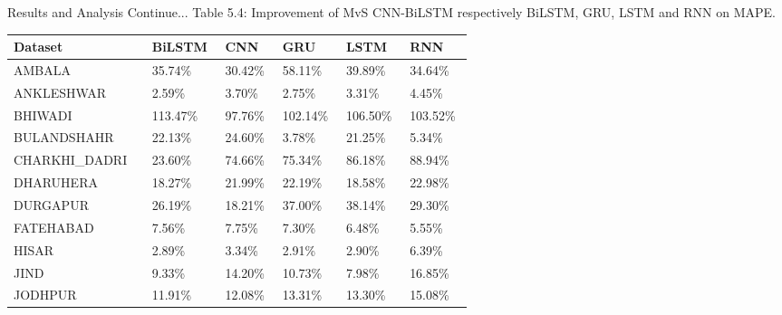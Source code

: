 \documentclass[12pt, aspectratio=169]{beamer}
\begin{document}
\begin{frame}{Results and Analysis \tiny{Continue...}}
	\centering
	\scriptsize{Table 5.4: Improvement of MvS CNN-BiLSTM respectively BiLSTM,  GRU,  LSTM and RNN on MAPE.}
	\begin{table}
        \begin{tabular}{ |p{0.19\linewidth} |p{0.08\linewidth} |p{0.08\linewidth} |p{0.08\linewidth} | p{0.08\linewidth} |p{0.08\linewidth}|}%
		\hline \scriptsize Dataset        & \scriptsize   BiLSTM & \scriptsize   CNN & \scriptsize  GRU & \scriptsize   LSTM & \scriptsize   RNN \\ \hline
		\scriptsize AMBALA & \scriptsize 35.74\% & \scriptsize 30.42\% & \scriptsize 58.11\% & \scriptsize 39.89\% & \scriptsize 34.64\% \\ \hline
		\scriptsize ANKLESHWAR & \scriptsize 2.59\% & \scriptsize 3.70\% & \scriptsize 2.75\% & \scriptsize 3.31\% & \scriptsize 4.45\% \\ \hline
		\scriptsize BHIWADI & \scriptsize 113.47\% & \scriptsize 97.76\% & \scriptsize 102.14\% & \scriptsize 106.50\% & \scriptsize 103.52\% \\ \hline
		\scriptsize BULANDSHAHR & \scriptsize 22.13\% & \scriptsize 24.60\% & \scriptsize 3.78\% & \scriptsize 21.25\% & \scriptsize 5.34\% \\ \hline
		\scriptsize CHARKHI\_DADRI & \scriptsize 23.60\% & \scriptsize 74.66\% & \scriptsize 75.34\% & \scriptsize 86.18\% & \scriptsize 88.94\% \\ \hline
		\scriptsize DHARUHERA & \scriptsize 18.27\% & \scriptsize 21.99\% & \scriptsize 22.19\% & \scriptsize 18.58\% & \scriptsize 22.98\% \\ \hline
		\scriptsize DURGAPUR & \scriptsize 26.19\% & \scriptsize 18.21\% & \scriptsize 37.00\% & \scriptsize 38.14\% & \scriptsize 29.30\% \\ \hline
		\scriptsize FATEHABAD & \scriptsize 7.56\% & \scriptsize 7.75\% & \scriptsize 7.30\% & \scriptsize 6.48\% & \scriptsize 5.55\% \\ \hline
		\scriptsize HISAR & \scriptsize 2.89\% & \scriptsize 3.34\% & \scriptsize 2.91\% & \scriptsize 2.90\% & \scriptsize 6.39\% \\ \hline
		\scriptsize JIND & \scriptsize 9.33\% & \scriptsize 14.20\% & \scriptsize 10.73\% & \scriptsize 7.98\% & \scriptsize 16.85\% \\ \hline
		\scriptsize JODHPUR & \scriptsize 11.91\% & \scriptsize 12.08\% & \scriptsize 13.31\% & \scriptsize 13.30\% & \scriptsize 15.08\% \\ \hline

\end{tabular}
\end{table}
\end{frame}
\end{document}
